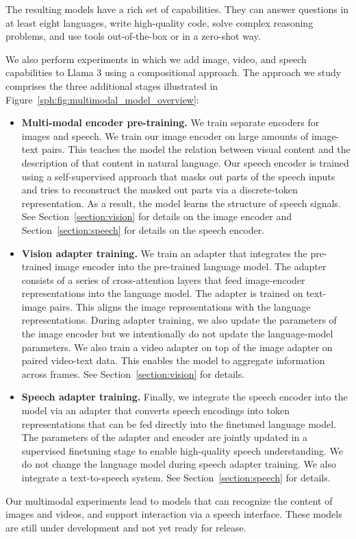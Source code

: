 The resulting models have a rich set of capabilities.
They can answer questions in at least eight languages, write high-quality code, solve complex reasoning problems, and use tools out-of-the-box or in a zero-shot way.

We also perform experiments in which we add image, video, and speech capabilities to Llama 3 using a compositional approach.
The approach we study comprises the three additional stages illustrated in Figure~\ref{sph:fig:multimodal_model_overview}:

\begin{itemize}

\item \textbf{Multi-modal encoder pre-training.} We train separate encoders for images and speech. We train our image encoder on large amounts of image-text pairs. This teaches the model the relation between visual content and the description of that content in natural language. Our speech encoder is trained using a self-supervised approach that masks out parts of the speech inputs and tries to reconstruct the masked out parts via a discrete-token representation. As a result, the model learns the structure of speech signals. See Section~\ref{section:vision} for details on the image encoder and Section~\ref{section:speech} for details on the speech encoder.

\item \textbf{Vision adapter training.} We train an adapter that integrates the pre-trained image encoder into the pre-trained language model. The adapter consists of a series of cross-attention layers that feed image-encoder representations into the language model. The adapter is trained on text-image pairs. This aligns the image representations with the language representations. During adapter training, we also update the parameters of the image encoder but we intentionally do not update the language-model parameters. We also train a video adapter on top of the image adapter on paired video-text data. This enables the model to aggregate information across frames. See Section~\ref{section:vision} for details.

\item \textbf{Speech adapter training.} Finally, we integrate the speech encoder into the model via an adapter that converts speech encodings into token representations that can be fed directly into the finetuned language model. The parameters of the adapter and encoder are jointly updated in a supervised finetuning stage to enable high-quality speech understanding. We do not change the language model during speech adapter training. We also integrate a text-to-speech system. See Section~\ref{section:speech} for details.

\end{itemize}

Our multimodal experiments lead to models that can recognize the content of images and videos, and support interaction via a speech interface.
These models are still under development and not yet ready for release.
